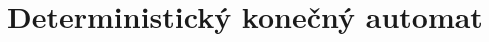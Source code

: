 \documentclass [11pt, a4paper]{article}
\begin{document}
\section{Deterministický konečný automat}
\clearpage
\end{document}
